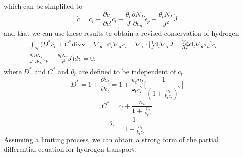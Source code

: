 \documentclass[10pt]{elsarticle}
\newcommand{\mbs}[1]{\boldsymbol{#1}}
\def\bs{{\mbs{s}}} \def\bt{{\mbs{t}}} \def\bu{{\mbs{u}}}
\def\bs{\boldsymbol}
\begin{document}
%
which can be simplified to
%
\begin{equation}
\label{eq.cdot}{\dot{c} = \dot{c}_{l} + \frac{\partial c_{t}}{\partial c{l}} \dot{c}_{l} + \frac{\theta_{l}}{J} \frac{\partial N_{T}}{\partial \epsilon_{p}} \dot{\epsilon}_{p} -  \frac{\theta_{t} N_{T}}{J^{2}}  \dot{J}}
\end{equation}
%
and that we can use these results to obtain a revised conservation of hydrogen
\begin{align}
\label{eq.hconservation4}  \int_{\mathcal{B}} (D^{*}\dot{c}_{l} + C^{*}\text{div}\bs{v} - \nabla_{\bs{x}} \cdot \bs{d}_{l} \nabla_{\bs{x}}c_{l}   -  \nabla_{\bs{x}} \cdot \bigg[ \frac{1}{J} \bs{d}_{l} \nabla_{\bs{x}}J -  \frac{V_{H}}{R T} \bs{d}_{l} \nabla_{\bs{x}}\tau_{h}\bigg] c_{l}  +  \nonumber \\ \frac{\theta_{l}}{J} \frac{\partial N_{T}}{\partial \epsilon_{p}} \dot{\epsilon}_{p} -  \frac{\theta_{t} N_{T}}{J^{2}}  \dot{J} )dv = 0.
\end{align}
where $D^{*}$ and $C^{*}$ and $\theta_{t}$ are defined to be independent of $c_{t}$.
%
\begin{equation}
\label{eq.Dstar}{D^{*} = 1 + \frac{\partial c_{t}}{\partial c_{l}} = 1 + \frac{n_{t} n_{l}}{k_{t} c_{l}^{2}}\bigg[ \frac{1}{(1+ \frac{n_{l}}{k_{t} c_{l}})^{2}}\bigg] }
\end{equation}
%
\begin{equation}
\label{eq.Cstar}{C^{*} = c_{l} +\frac{n_{t}}{1 + \frac{n_{l}}{k_{t} c_{l}}} }
\end{equation}
%
\begin{equation}
\label{eq.thetat2}{\theta_{t} = \frac{1}{1 + \frac{n_{l}}{k_{t} c_{l}}} }
\end{equation}
%
Assuming a limiting process, we can obtain a strong form of the partial differential equation for hydrogen transport.
%
\end{document}

